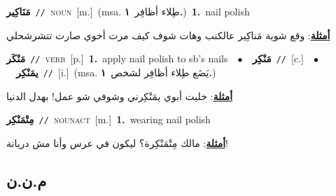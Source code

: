 \documentclass[10pt,a4paper,twoside]{article} %
\begin{document}
\begin{multicols}{2}
{\setlength\topsep{0pt}\textbf{\foreignlanguage{arabic}{مَنَاكِير}}\ {\color{gray}\texttt{//}\color{black}}\ \textsc{noun}\ [m.]\ \color{gray}(msa. \foreignlanguage{arabic}{طِلاء أظافِر}~\foreignlanguage{arabic}{\textbf{١.}})\color{black}\ \textbf{1.}~nail polish\  \begin{flushright}\color{gray}\foreignlanguage{arabic}{\textbf{\underline{\foreignlanguage{arabic}{أمثلة}}}: وقع شوية مَناكِير عالكنب وهات شوف كيف مرت أخوي صارت تتشرشحلي}\end{flushright}\color{black}} \vspace{2mm}

{\setlength\topsep{0pt}\textbf{\foreignlanguage{arabic}{مَنْكَر}}\ {\color{gray}\texttt{//}\color{black}}\ \textsc{verb}\ [p.]\ \textbf{1.}~apply nail polish to sb's nails\ \ $\bullet$\ \ \setlength\topsep{0pt}\textbf{\foreignlanguage{arabic}{مَنْكِر}}\ {\color{gray}\texttt{//}\color{black}}\ [c.]\ \ $\bullet$\ \ \setlength\topsep{0pt}\textbf{\foreignlanguage{arabic}{يمَنْكِر}}\ {\color{gray}\texttt{//}\color{black}}\ [i.]\ \color{gray}(msa. \foreignlanguage{arabic}{يَضَع طِلاء أظافِر لشخص}~\foreignlanguage{arabic}{\textbf{١.}})\color{black}\  \begin{flushright}\color{gray}\foreignlanguage{arabic}{\textbf{\underline{\foreignlanguage{arabic}{أمثلة}}}: خليت أبوي يمَنْكِرني وشوفي شو عمل! بهدل الدنيا}\end{flushright}\color{black}} \vspace{2mm}

{\setlength\topsep{0pt}\textbf{\foreignlanguage{arabic}{مِتْمَنْكِر}}\ {\color{gray}\texttt{//}\color{black}}\ \textsc{noun\textunderscore act}\ [m.]\ \textbf{1.}~wearing nail polish\  \begin{flushright}\color{gray}\foreignlanguage{arabic}{\textbf{\underline{\foreignlanguage{arabic}{أمثلة}}}: مالك مِتْمَنْكِرة؟ ليكون في عرس وأنا مش دريانة!}\end{flushright}\color{black}} \vspace{2mm}

\vspace{-3mm}
\subsection*{\color{blue}\foreignlanguage{arabic}{م.ن.ن}\color{blue}{}} 


\end{multicols}
\end{document}
